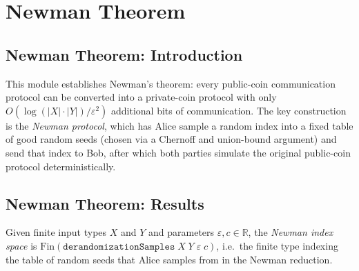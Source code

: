 \section{Newman Theorem}
\subsection*{Newman Theorem: Introduction}

This module establishes Newman's theorem: every public-coin communication protocol
can be converted into a private-coin protocol with only $O(\log(|X| \cdot |Y|) / \varepsilon^2)$
additional bits of communication. The key construction is the \emph{Newman protocol}, which has
Alice sample a random index into a fixed table of good random seeds (chosen via a Chernoff
and union-bound argument) and send that index to Bob, after which both parties simulate the
original public-coin protocol deterministically.

\subsection*{Newman Theorem: Results}

\begin{definition}
\label{CommunicationComplexity.PublicCoin.newmanIndexSpace}
\leanok
{}
Given finite input types $X$ and $Y$ and parameters $\varepsilon, c \in \mathbb{R}$,
the \emph{Newman index space} is $\mathrm{Fin}(\mathtt{derandomizationSamples}\;X\;Y\;\varepsilon\;c)$,
i.e.\ the finite type indexing the table of random seeds that Alice samples from in the Newman
reduction.
\end{definition}

